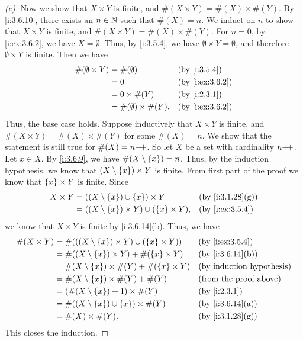 \begin{proof}[(e)]
  Now we show that \(X \times Y\) is finite, and \(\#(X \times Y) = \#(X) \times \#(Y)\).
  By \cref{i:3.6.10}, there exists an \(n \in \mathbb{N}\) such that \(\#(X) = n\).
  We induct on \(n\) to show that \(X \times Y\) is finite, and \(\#(X \times Y) = \#(X) \times \#(Y)\).
  For \(n = 0\), by \cref{i:ex:3.6.2}, we have \(X = \emptyset\).
  Thus, by \cref{i:3.5.4}, we have \(\emptyset \times Y = \emptyset\), and therefore \(\emptyset \times Y\) is finite.
  Then we have
  \begin{align*}
    \#(\emptyset \times Y) & = \#(\emptyset)               &  & \by{i:3.5.4}    \\
                           & = 0                           &  & \by{i:ex:3.6.2} \\
                           & = 0 \times \#(Y)              &  & \by{i:2.3.1}    \\
                           & = \#(\emptyset) \times \#(Y). &  & \by{i:ex:3.6.2}
  \end{align*}
  Thus, the base case holds.
  Suppose inductively that \(X \times Y\) is finite, and \(\#(X \times Y) = \#(X) \times \#(Y)\) for some \(\#(X) = n\).
  We show that the statement is still true for \(\#(X) = n{+}\!{+}\).
  So let \(X\) be a set with cardinality \(n{+}\!{+}\).
  Let \(x \in X\).
  By \cref{i:3.6.9}, we have \(\#(X \setminus \left\lbrace x\right\rbrace) = n\).
  Thus, by the induction hypothesis, we know that \((X \setminus \left\lbrace x\right\rbrace) \times Y\) is finite.
  From first part of the proof we know that \(\left\lbrace x\right\rbrace \times Y\) is finite.
  Since
  \begin{align*}
    X \times Y & = ((X \setminus \set{x}) \cup \set{x}) \times Y             &  & \by{i:3.1.28}[g] \\
               & = ((X \setminus \set{x}) \times Y) \cup (\set{x} \times Y), &  & \by{i:ex:3.5.4}
  \end{align*}
  we know that \(X \times Y\) is finite by \cref{i:3.6.14}(b).
  Thus, we have
  \begin{align*}
    \#(X \times Y) & = \#(((X \setminus \set{x}) \times Y) \cup (\set{x} \times Y)) &  & \by{i:ex:3.5.4}               \\
                   & = \#((X \setminus \set{x}) \times Y) + \#(\set{x} \times Y)    &  & \by{i:3.6.14}[b]              \\
                   & = \#(X \setminus \set{x}) \times \#(Y) + \#(\set{x} \times Y)  &  & \byIH                         \\
                   & = \#(X \setminus \set{x}) \times \#(Y) + \#(Y)                 &  & \text{(from the proof above)} \\
                   & = (\#(X \setminus \set{x}) + 1) \times \#(Y)                   &  & \by{i:2.3.1}                  \\
                   & = \#((X \setminus \set{x}) \cup \set{x}) \times \#(Y)          &  & \by{i:3.6.14}[a]              \\
                   & = \#(X) \times \#(Y).                                          &  & \by{i:3.1.28}[g]
  \end{align*}
  This closes the induction.
\end{proof}

